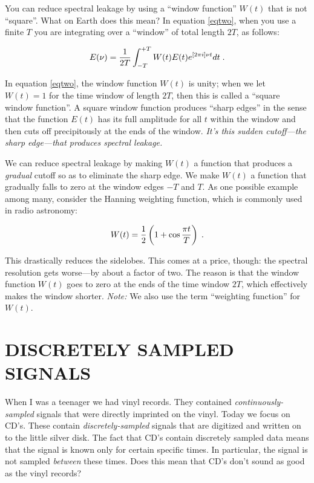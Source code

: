 \documentclass[preprint]{aastex}
\begin{document}
        You can reduce spectral leakage by using a ``window function''
$W(t)$ that is not ``square''.  What on Earth does this mean? In equation
\ref{eqtwo}, when you use a finite $T$ you are integrating over a    
``window'' of total length $2T$, as follows:

\begin{equation}
E(\nu) = {1 \over 2T}
\int_{-T}^{+T} W(t) E(t) e^{[2 \pi i]\nu t}  dt \; .
\end{equation}

\noindent In equation \ref{eqtwo}, the window function $W(t)$ is unity;
when  we let $W(t) = 1$ for the time window of length $2T$, then this is
called a ``square window function''.  A square window function produces 
``sharp edges'' in the sense that the function $E(t)$ has its full
amplitude for all $t$ within the window and then cuts off precipitously
at the ends of the window.  {\it It's this sudden cutoff---the sharp
edge---that produces spectral leakage.}

        We can reduce spectral leakage by making $W(t)$ a function that
produces a {\it gradual} cutoff so as to eliminate the sharp edge.  We
make $W(t)$ a function that gradually falls to zero at the window edges
$-T$ and $T$. As one possible example among many, consider the Hanning
weighting function, which is commonly used in radio astronomy:

\begin{equation}
W(t) = {1 \over 2} \left( 1 + \cos{\pi t \over T} \right) \; .
\label{weighting}
\end{equation}

\noindent This drastically reduces the sidelobes.  This comes at a
price, though: the spectral resolution gets worse---by about a factor
of two.  The reason is that the window function $W(t)$ goes to zero
at the ends of the time window $2T$, which effectively makes the window
shorter. {\it Note:} We also use the term ``weighting function'' for
$W(t)$.



\section{DISCRETELY SAMPLED SIGNALS}

	When I was a teenager we had vinyl records.  They contained {\it
continuously-sampled} signals that were directly imprinted on the vinyl. 
Today we focus on CD's.  These contain {\it discretely-sampled} signals
that are digitized and written on to the little silver disk.  The fact
that CD's contain discretely sampled data means that the signal is known
only for certain specific times.  In particular, the signal is not
sampled {\it between} these times.  Does this mean that CD's don't sound
as good as the vinyl records?
\end{document}
